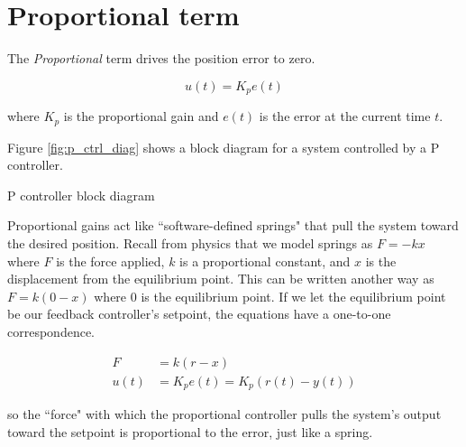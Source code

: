 \section{Proportional term}

The \textit{Proportional} term drives the position error to zero.

\begin{definition}
  \begin{equation}
    u(t) = K_p e(t)
  \end{equation}

  where $K_p$ is the proportional gain and $e(t)$ is the error at the current
  time $t$.
\end{definition}

Figure \ref{fig:p_ctrl_diag} shows a block diagram for a \gls{system}
controlled by a P controller.

\begin{bookfigure}

  \caption{P controller block diagram}
  \label{fig:p_ctrl_diag}
\end{bookfigure}

Proportional gains act like ``software-defined springs" that pull the
\gls{system} toward the desired position. Recall from physics that we model
springs as $F = -kx$ where $F$ is the force applied, $k$ is a proportional
constant, and $x$ is the displacement from the equilibrium point. This can be
written another way as $F = k(0 - x)$ where $0$ is the equilibrium point.
If we let the equilibrium point be our feedback controller's \gls{setpoint}, the
equations have a one-to-one correspondence.

\begin{align*}
  F &= k(r - x) \\
  u(t) &= K_p e(t) = K_p(r(t) - y(t))
\end{align*}

so the ``force" with which the proportional controller pulls the \gls{system}'s
\gls{output} toward the \gls{setpoint} is proportional to the \gls{error}, just
like a spring.
